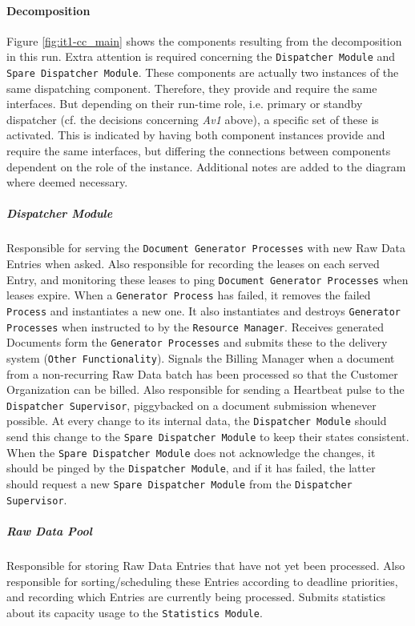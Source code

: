 \documentclass[a4paper,10pt]{article}
\begin{document}
\paragraph{Decomposition}
Figure \ref{fig:it1-cc_main} shows the components resulting from the decomposition in this run. Extra attention is required concerning the \texttt{Dispatcher Module} and \texttt{Spare Dispatcher Module}. These components are actually two instances of the same dispatching component. Therefore, they provide and require the same interfaces. But depending on their run-time role, i.e. primary or standby dispatcher (cf. the decisions concerning \emph{Av1} above), a specific set of these is activated. This is indicated by having both component instances provide and require the same interfaces, but differing the connections between components dependent on the role of the instance. Additional notes are added to the diagram where deemed necessary.

\subparagraph{Dispatcher Module}
Responsible for serving the \texttt{Document Generator Processes} with new Raw Data Entries when asked. Also responsible for recording the leases on each served Entry, and monitoring these leases to ping \texttt{Document Generator Processes} when leases expire. When a \texttt{Generator Process} has failed, it removes the failed \texttt{Process} and instantiates a new one. It also instantiates and destroys \texttt{Generator Processes} when instructed to by the \texttt{Resource Manager}. Receives generated Documents form the \texttt{Generator Processes} and submits these to the delivery system (\texttt{Other Functionality}). Signals the Billing Manager when a document from a non-recurring Raw Data batch has been processed so that the Customer Organization can be billed. Also responsible for sending a Heartbeat pulse to the \texttt{Dispatcher Supervisor}, piggybacked on a document submission whenever possible. At every change to its internal data, the \texttt{Dispatcher Module} should send this change to the \texttt{Spare Dispatcher Module} to keep their states consistent. When the \texttt{Spare Dispatcher Module} does not acknowledge the changes, it should be pinged by the \texttt{Dispatcher Module}, and if it has failed, the latter should request a new \texttt{Spare Dispatcher Module} from the \texttt{Dispatcher Supervisor}.

\subparagraph{Raw Data Pool}
Responsible for storing Raw Data Entries that have not yet been processed. Also responsible for sorting/scheduling these Entries according to deadline priorities, and recording which Entries are currently being processed. Submits statistics about its capacity usage to the \texttt{Statistics Module}.
\end{document}
